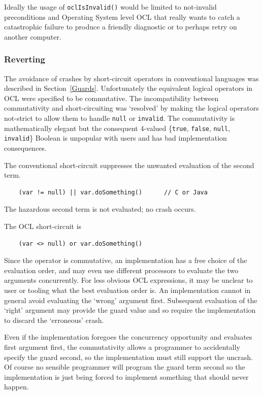 \documentclass[
]{ceurart}
\begin{document}
Ideally the usage of \verb|oclIsInvalid()| would be limited to not-invalid preconditions and Operating System level OCL that really wants to catch a catastrophic failure to produce a friendly diagnostic or to perhaps retry on another computer.

\subsubsection{Reverting}

The avoidance of crashes by short-circuit operators in conventional languages was described in Section~\ref{Guards}. Unfortunately the equivalent logical operators in OCL were  specified to be commutative. The incompatibility between commutativity and short-circuiting was `resolved' by making the logical operators not-strict to allow them to handle \verb|null| or \verb|invalid|. The commutativity is mathematically elegant but the consequent 4-valued \{\verb|true|, \verb|false|, \verb|null|, \verb|invalid|\} Boolean is unpopular with users and has bad implementation consequences.

The conventional short-circuit suppresses the unwanted evaluation of the second term.

\begin{verbatim}
    (var != null) || var.doSomething()		// C or Java
\end{verbatim}

The hazardous second term is not evaluated; no crash occurs.

The OCL short-circuit is

\begin{verbatim}
    (var <> null) or var.doSomething()
\end{verbatim}

Since the operator is commutative, an implementation has a free choice of the evaluation order, and may even use different processors to evaluate the two arguments concurrently. For less obvious OCL expressions, it may be unclear to user or tooling what the best evaluation order is. An implementation cannot in general avoid evaluating the `wrong' argument first. Subsequent evaluation of the `right' argument may provide the guard value and so require the implementation to discard the `erroneous' crash.

Even if the implementation foregoes the concurrency opportunity and evaluates first argument first, the commutativity allows a programmer to accidentally specify the guard second, so the implementation must still support the uncrash. Of course no sensible programmer will program the guard term second so the implementation is just being forced to implement something that should never happen.
\end{document}
